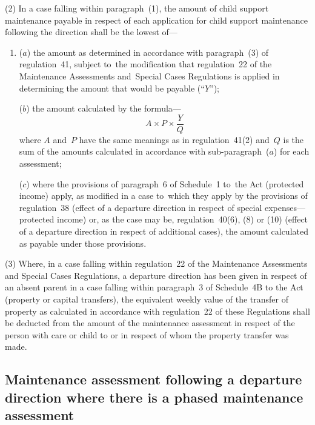 \documentclass[12pt,a4paper]{article}
\begin{document}
(2) In a case falling within paragraph~(1), the amount of child support maintenance payable in respect of each application for child support maintenance following the direction shall be the 
lowest  %
of—
\begin{enumerate}\item[]
($a$) the amount as determined in accordance with paragraph~(3) of regulation~41,
subject to~the modification that regulation~22 of the Maintenance Assessments
and~Special Cases Regulations is applied in determining the amount that would be
payable (“$Y$”);

($b$) the amount calculated by the formula—
\[A \times P \times \frac{Y}{Q}\]
where $A$ and~$P$ have the same meanings as in regulation~41(2) and~$Q$ is the sum of
the amounts calculated in accordance with sub-paragraph~($a$) for each assessment;

($c$) where the provisions of paragraph~6 of Schedule~1 to~the Act (protected income) apply, as modified in a case to~which they apply by the provisions of regulation~38 (effect of a departure direction in respect of special expenses—protected income) or, as the case may be, regulation~40(6), (8) or (10) (effect of a departure direction in respect of additional cases), the amount calculated as payable under those provisions.
\end{enumerate}

(3) Where, in a case falling within regulation~22 of the Maintenance Assessments
and Special Cases Regulations, a departure direction has been given in respect
of an absent parent in a case falling within paragraph~3 of Schedule~4B to the
Act (property or capital transfers), the equivalent weekly value of the transfer
of property as calculated in accordance with regulation~22 of these Regulations
shall be deducted from the amount of the maintenance assessment in respect of
the person with care or child to or in respect of whom the property transfer was
made.


\subsection[44. Maintenance assessment following a departure direction where there is a phased
maintenance assessment]{\sloppy Maintenance assessment following a departure direction where there is a phased
maintenance assessment}
\end{document}
